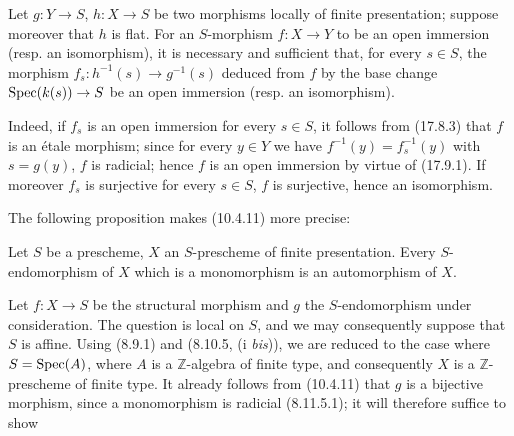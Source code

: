 \begin{corollary}[17.9.5]
\label{IV.17.9.5}
Let $g:Y\to S$, $h:X\to S$ be two morphisms locally of finite presentation; suppose moreover that $h$ is flat. For an $S$-morphism $f:X\to Y$ to be an open immersion (resp. an isomorphism), it is necessary and sufficient that, for every $s\in S$, the morphism $f_s:h^{-1}(s)\to g^{-1}(s)$ deduced from $f$ by the base change $\operatorname{Spec}(k(s))\to S$ be an open immersion (resp. an isomorphism).
\end{corollary}

Indeed, if $f_s$ is an open immersion for every $s\in S$, it follows from (17.8.3) that $f$ is an étale morphism; since for every $y\in Y$ we have $f^{-1}(y)=f_s^{-1}(y)$ with $s=g(y)$, $f$ is radicial; hence $f$ is an open immersion by virtue of (17.9.1). If moreover $f_s$ is surjective for every $s\in S$, $f$ is surjective, hence an isomorphism.

The following proposition makes (10.4.11) more precise:

\begin{proposition}[17.9.6]\label{IV.17.9.6}
Let $S$ be a prescheme, $X$ an $S$-prescheme of finite presentation. Every $S$-endomorphism of $X$ which is a monomorphism is an automorphism of $X$.
\end{proposition}

Let $f:X\to S$ be the structural morphism and $g$ the $S$-endomorphism under consideration. The question is local on $S$, and we may consequently suppose that $S$ is affine. Using (8.9.1) and (8.10.5, (i \emph{bis})), we are reduced to the case where $S=\operatorname{Spec}(A)$, where $A$ is a $\mathbb{Z}$-algebra of finite type, and consequently $X$ is a $\mathbb{Z}$-prescheme of finite type. It already follows from (10.4.11) that $g$ is a bijective morphism, since a monomorphism is radicial (8.11.5.1); it will therefore suffice to show


